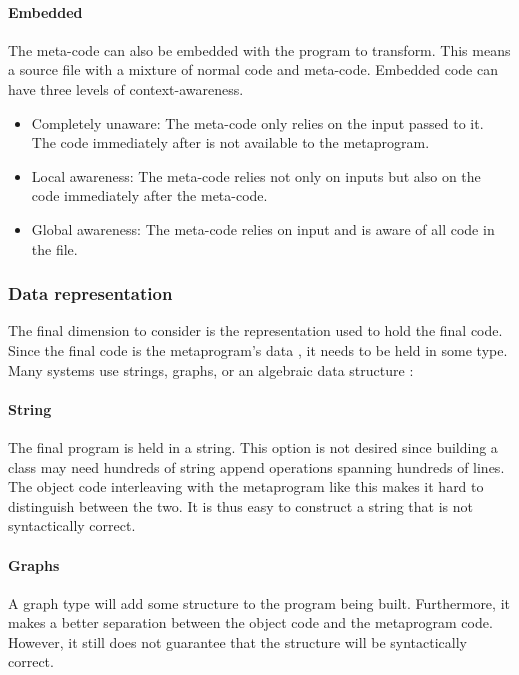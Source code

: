 \paragraph{Embedded}
The meta-code can also be embedded with the program to transform.
This means a source file with a mixture of normal code and meta-code.
Embedded code can have three levels of context-awareness. \cite{savidis_19_01}

\begin{itemize}
	\item Completely unaware: The meta-code only relies on the input passed to it.
	      The code immediately after is not available to the metaprogram.
	\item Local awareness: The meta-code relies not only on inputs but also on the code immediately after the meta-code.
	\item Global awareness: The meta-code relies on input and is aware of all code in the file.
\end{itemize}

\subsubsection{Data representation}
The final dimension to consider is the representation used to hold the final code.
Since the final code is the metaprogram's data \cite{bawden_99_01}, it needs to be held in some type.
Many systems use strings, graphs, or an algebraic data structure \cite{sheard_01_01}:

\paragraph{String}
The final program is held in a string.
This option is not desired since building a class may need hundreds of string append operations spanning hundreds of lines.
The object code interleaving with the metaprogram like this makes it hard to distinguish between the two.
It is thus easy to construct a string that is not syntactically correct.

\paragraph{Graphs}
A graph type will add some structure to the program being built.
Furthermore, it makes a better separation between the object code and the metaprogram code.
However, it still does not guarantee that the structure will be syntactically correct.

